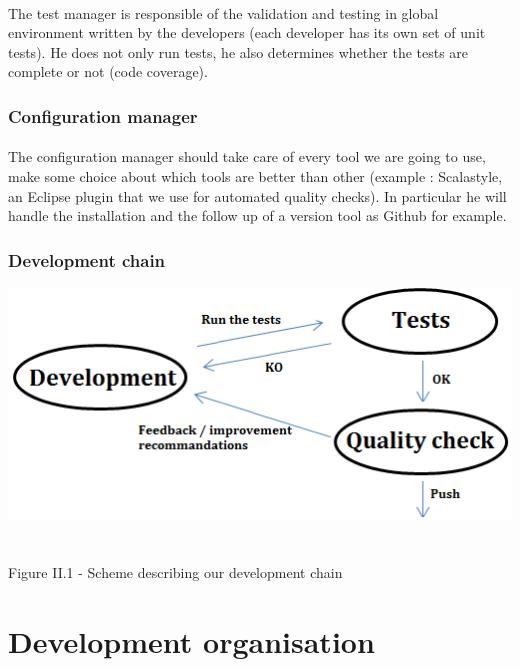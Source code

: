 \documentclass{report}
\begin{document}
\paragraph{}
\hspace{4mm}The test manager is responsible of the validation and testing in global environment written by the developers (each developer has its own set of unit tests). He does not only run tests, he also determines whether the tests are complete or not (code coverage).

\subsubsection{Configuration manager}

\paragraph{}
\hspace{4mm}The configuration manager should take care of every tool we are going to use, make some choice about which tools are better than other (example :
Scalastyle, an Eclipse plugin that we use for automated quality checks).
In particular he will handle the installation and the follow up of a version tool as Github for example.

\subsubsection{Development chain}

\begin{center}
\includegraphics[scale=0.7]{data/cycle_qualite}
~\\~\\Figure II.1 - Scheme describing our development chain
\end{center}

\section{Development organisation}
\end{document}
